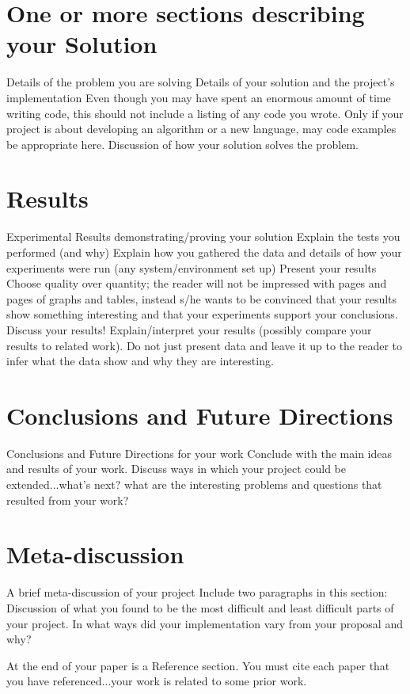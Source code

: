 \documentclass[11pt,twocolumn]{article}
\begin{document}
\section {One or more sections describing your Solution}\label{soln}
Details of the problem you are solving Details of your solution and the
project's implementation Even though you may have spent an enormous amount of
time writing code, this should not include a listing of any code you wrote.
Only if your project is about developing an algorithm or a new language, may
code examples be appropriate here.  Discussion of how your solution solves the
problem.


\section {Results}\label{results}
Experimental Results demonstrating/proving your solution Explain the tests you
performed (and why) Explain how you gathered the data and details of how your
experiments were run (any system/environment set up) Present your results
Choose quality over quantity; the reader will not be impressed with pages and
pages of graphs and tables, instead s/he wants to be convinced that your
results show something interesting and that your experiments support your
conclusions.  Discuss your results!  Explain/interpret your results (possibly
compare your results to related work). Do not just present data and leave it up
to the reader to infer what the data show and why they are interesting.  

\section{Conclusions and Future Directions}\label{conc} 
Conclusions and Future Directions for your work Conclude with the main ideas
and results of your work. Discuss ways in which your project could be
extended...what's next? what are the interesting problems and questions that
resulted from your work?

\section{Meta-discussion}\label{meta} 
A brief meta-discussion of your project Include two paragraphs in this section:
Discussion of what you found to be the most difficult and least difficult parts
of your project.  In what ways did your implementation vary from your proposal
and why?  


At the end of your paper is a Reference section. You must cite each paper that
you have referenced...your work is related to some prior work.
\end{document}
